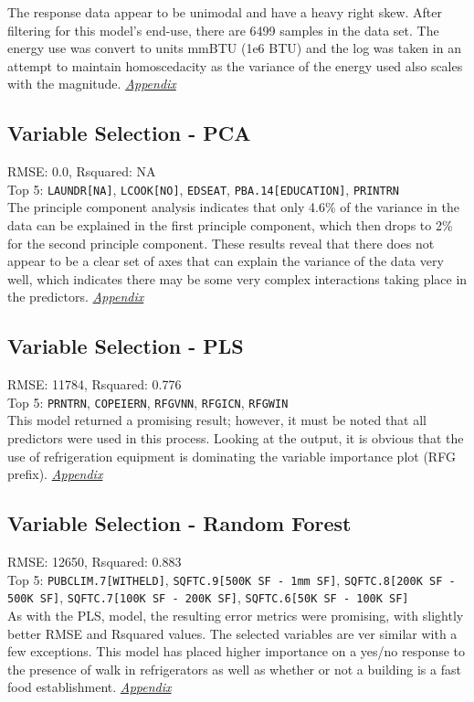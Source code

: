 The response data appear to be unimodal and have a heavy right skew.  After filtering for this model's end-use, there are 6499 samples in the data set.  The energy use was convert to units mmBTU (1e6 BTU) and the log was taken in an attempt to maintain homoscedacity as the variance of the energy used also scales with the magnitude.  \textit{\hyperref[appendix:electricity:response]{Appendix}}

\subsection{Variable Selection - PCA}
RMSE: 0.0, Rsquared: NA\\
Top 5: \lstinline{LAUNDR[NA]}, \lstinline{LCOOK[NO]}, \lstinline{EDSEAT}, \lstinline{PBA.14[EDUCATION]}, \lstinline{PRINTRN}
\\[0.1in]
\indent The principle component analysis indicates that only 4.6\% of the variance in the data can be explained in the first principle component, which then drops to 2\% for the second principle component.  These results reveal that there does not appear to be a clear set of axes that can explain the variance of the data very well, which indicates there may be some very complex interactions taking place in the predictors.  \textit{\hyperref[appendix:electricity:pca]{Appendix}}

\subsection{Variable Selection - PLS}
RMSE: 11784, Rsquared: 0.776\\
Top 5: \lstinline{PRNTRN}, \lstinline{COPEIERN}, \lstinline{RFGVNN}, \lstinline{RFGICN}, \lstinline{RFGWIN}
\\[0.1in]
\indent This model returned a promising result; however, it must be noted that all predictors were used in this process.  Looking at the output, it is obvious that the use of refrigeration equipment is dominating the variable importance plot (RFG prefix).  \textit{\hyperref[appendix:electricity:pls]{Appendix}}

\subsection{Variable Selection - Random Forest}
RMSE: 12650, Rsquared: 0.883\\
Top 5: \lstinline{PUBCLIM.7[WITHELD]}, \lstinline{SQFTC.9[500K SF - 1mm SF]}, \lstinline{SQFTC.8[200K SF - 500K SF]}, \lstinline{SQFTC.7[100K SF - 200K SF]}, \lstinline{SQFTC.6[50K SF - 100K SF]}
\\[0.1in]
\indent As with the PLS, model, the resulting error metrics were promising, with slightly better RMSE and Rsquared values.  The selected variables are ver similar with a few exceptions.  This model has placed higher importance on a yes/no response to the presence of walk in refrigerators as well as whether or not a building is a fast food establishment.  \textit{\hyperref[appendix:electricity:rf]{Appendix}}

